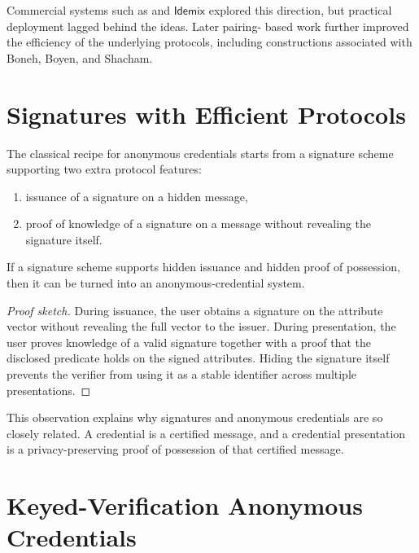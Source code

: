 \documentclass[11pt]{article}
\newcommand{\Idemix}{\ensuremath{\mathsf{Idemix}}}
\begin{document}
Commercial systems such as  and \Idemix{} explored this
direction, but practical deployment lagged behind the ideas.  Later pairing-
based work further improved the efficiency of the underlying protocols,
including constructions associated with Boneh, Boyen, and Shacham.

\section{Signatures with Efficient Protocols}

The classical recipe for anonymous credentials starts from a signature scheme
supporting two extra protocol features:
\begin{enumerate}
  \item issuance of a signature on a hidden message,
  \item proof of knowledge of a signature on a message without revealing the
        signature itself.
\end{enumerate}

\begin{proposition}
If a signature scheme supports hidden issuance and hidden proof of possession,
then it can be turned into an anonymous-credential system.
\end{proposition}

\begin{proof}[Proof sketch]
During issuance, the user obtains a signature on the attribute vector without
revealing the full vector to the issuer.  During presentation, the user proves
knowledge of a valid signature together with a proof that the disclosed
predicate holds on the signed attributes.  Hiding the signature itself prevents
the verifier from using it as a stable identifier across multiple
presentations.
\end{proof}

This observation explains why signatures and anonymous credentials are so
closely related.  A credential is a certified message, and a credential
presentation is a privacy-preserving proof of possession of that certified
message.

\section{Keyed-Verification Anonymous Credentials}
\end{document}
